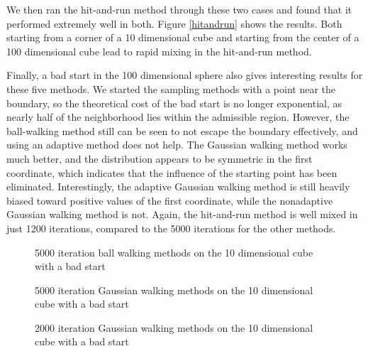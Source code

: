\documentclass[11pt]{article}
\begin{document}
We then ran the hit-and-run method through these two cases and found that it performed extremely well in both. Figure \ref{hitandrun} shows the results. Both starting from a corner of a 10 dimensional cube and starting from the center of a 100 dimensional cube lead to rapid mixing in the hit-and-run method.

Finally, a bad start in the 100 dimensional sphere also gives interesting results for these five methods. We started the sampling methods with a point near the boundary, so the theoretical cost of the bad start is no longer exponential, as nearly half of the neighborhood lies within the admissible region. However, the ball-walking method still can be seen to not escape the boundary effectively, and using an adaptive method does not help. The Gaussian walking method works much better, and the distribution appears to be symmetric in the first coordinate, which indicates that the influence of the starting point has been eliminated. Interestingly, the adaptive Gaussian walking method is still heavily biased toward positive values of the first coordinate, while the nonadaptive Gaussian walking method is not. Again, the hit-and-run method is well mixed in just 1200 iterations, compared to the 5000 iterations for the other methods.

\begin{figure}
\centering
{}
\caption{5000 iteration ball walking methods on the 10 dimensional cube with a bad start}
\label{ballwalking}
\end{figure}

\begin{figure}
\centering
{}
\caption{5000 iteration Gaussian walking methods on the 10 dimensional cube with a bad start}
\label{gaussian}
\end{figure}

\begin{figure}
\centering
{}
\caption{2000 iteration Gaussian walking methods on the 10 dimensional cube with a bad start}
\label{gaussian_short}
\end{figure}
\end{document}
